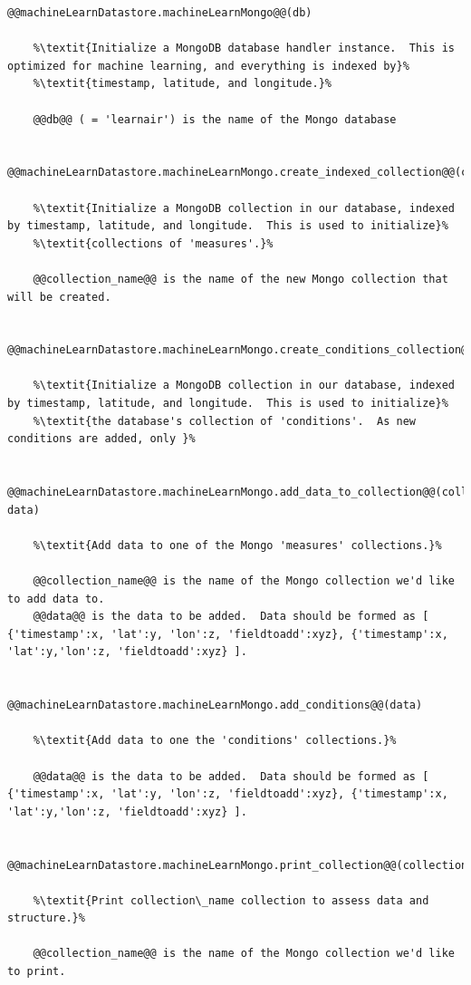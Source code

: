 \begin{lstlisting}[style=codedef]
@@machineLearnDatastore.machineLearnMongo@@(db)
	
	%\textit{Initialize a MongoDB database handler instance.  This is optimized for machine learning, and everything is indexed by}%
	%\textit{timestamp, latitude, and longitude.}%

	@@db@@ ( = 'learnair') is the name of the Mongo database
	

@@machineLearnDatastore.machineLearnMongo.create_indexed_collection@@(collection_name)
	
	%\textit{Initialize a MongoDB collection in our database, indexed by timestamp, latitude, and longitude.  This is used to initialize}%
	%\textit{collections of 'measures'.}%

	@@collection_name@@ is the name of the new Mongo collection that will be created.
	

@@machineLearnDatastore.machineLearnMongo.create_conditions_collection@@(collection_name)
	
	%\textit{Initialize a MongoDB collection in our database, indexed by timestamp, latitude, and longitude.  This is used to initialize}%
 	%\textit{the database's collection of 'conditions'.  As new conditions are added, only }%


@@machineLearnDatastore.machineLearnMongo.add_data_to_collection@@(collection_name, data)
	
	%\textit{Add data to one of the Mongo 'measures' collections.}%

	@@collection_name@@ is the name of the Mongo collection we'd like to add data to.
	@@data@@ is the data to be added.  Data should be formed as [ {'timestamp':x, 'lat':y, 'lon':z, 'fieldtoadd':xyz}, {'timestamp':x, 'lat':y,'lon':z, 'fieldtoadd':xyz} ].
	

@@machineLearnDatastore.machineLearnMongo.add_conditions@@(data)
	
	%\textit{Add data to one the 'conditions' collections.}%

	@@data@@ is the data to be added.  Data should be formed as [ {'timestamp':x, 'lat':y, 'lon':z, 'fieldtoadd':xyz}, {'timestamp':x, 'lat':y,'lon':z, 'fieldtoadd':xyz} ].


@@machineLearnDatastore.machineLearnMongo.print_collection@@(collection_name)
	
	%\textit{Print collection\_name collection to assess data and structure.}%

	@@collection_name@@ is the name of the Mongo collection we'd like to print.



\end{lstlisting}
